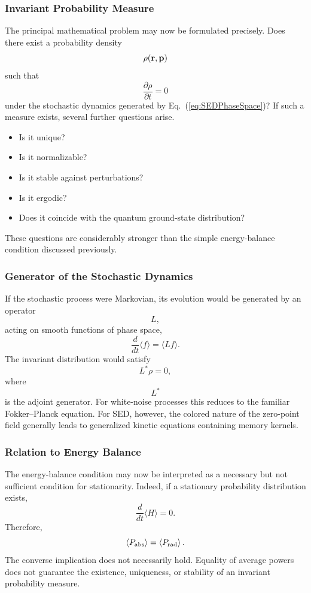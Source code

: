 \subsubsection{Invariant Probability Measure}
The principal mathematical problem may now be formulated precisely.
Does there exist a probability density
\[\rho({\bf r},{\bf p})\]
such that
\begin{equation}
\frac{\partial\rho}{\partial t}=0
\end{equation}
under the stochastic dynamics generated by
Eq.~(\ref{eq:SEDPhaseSpace})?
If such a measure exists, several further questions arise.
\begin{itemize}
\item
Is it unique?
\item
Is it normalizable?
\item
Is it stable against perturbations?
\item
Is it ergodic?
\item
Does it coincide with the quantum ground-state distribution?
\end{itemize}
These questions are considerably stronger than the simple energy-balance
condition discussed previously.
\subsubsection{Generator of the Stochastic Dynamics}
If the stochastic process were Markovian, its evolution would be
generated by an operator
\[L,\]
acting on smooth functions of phase space,
\[\frac{d}{dt}\langle f\rangle=\langle Lf\rangle.\]
The invariant distribution would satisfy
\begin{equation}
L^*\rho=0,
\end{equation}
where
\[L^*\]
is the adjoint generator.
For white-noise processes this reduces to the familiar
Fokker--Planck equation.
For SED, however, the colored nature of the zero-point field generally
leads to generalized kinetic equations containing memory kernels.
\subsubsection{Relation to Energy Balance}
The energy-balance condition may now be interpreted as a necessary but
not sufficient condition for stationarity.
Indeed,
if a stationary probability distribution exists,
\[\frac{d}{dt}\langle H\rangle=0.\]
Therefore,
\[\left<P_{\rm abs}\right>=\left<P_{\rm rad}\right>.\]
The converse implication does not necessarily hold.
Equality of average powers does not guarantee the existence,
uniqueness, or stability of an invariant probability measure.
